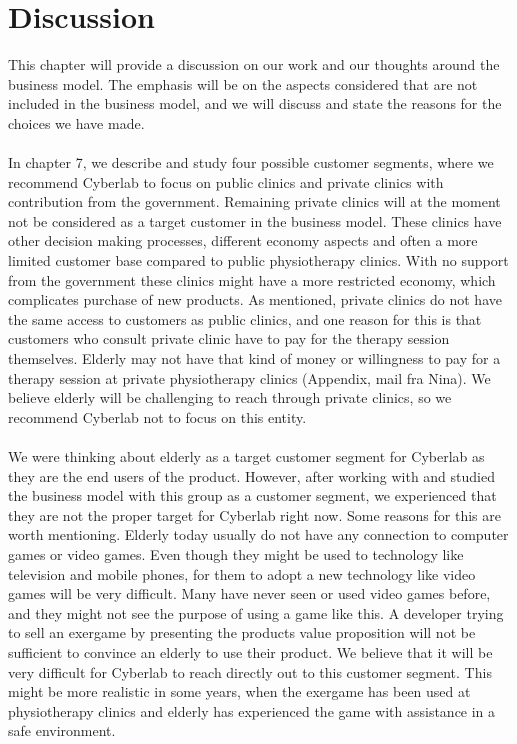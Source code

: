 \chapter{Discussion}
This chapter will provide a discussion on our work and our thoughts around the business model. The emphasis will be on the aspects considered that are not included in the business model, and we will discuss and state the reasons for the choices we have made.  \\ \\
In chapter 7, we describe and study four possible customer segments, where we recommend Cyberlab to focus on public clinics and private clinics with contribution from the government. Remaining private clinics will at the moment not be considered as a target customer in the business model. These clinics have other decision making processes, different economy aspects and often a more limited customer base compared to public physiotherapy clinics. With no support from the government these clinics might have a more restricted economy, which complicates purchase of new products. As mentioned, private clinics do not have the same access to customers as public clinics, and one reason for this is that customers who consult private clinic have to pay for the therapy session themselves. Elderly may not have that kind of money or willingness to pay for a therapy session at private physiotherapy clinics (Appendix, mail fra Nina). We believe elderly will be challenging to reach through private clinics, so we recommend Cyberlab not to focus on this entity. \\ \\
We were thinking about elderly as a target customer segment for Cyberlab as they are the end users of the product. However, after working with and studied the business model with this group as a customer segment, we experienced that they are not the proper target for Cyberlab right now. Some reasons for this are worth mentioning. Elderly today usually do not have any connection to computer games or video games. Even though they might be used to technology like television and mobile phones, for them to adopt a new technology like video games will be very difficult. Many have never seen or used video games before, and they might not see the purpose of using a game like this. A developer trying to sell an exergame by presenting the products value proposition will not be sufficient to convince an elderly to use their product. We believe that it will be very difficult for Cyberlab to reach directly out to this customer segment. This might be more realistic in some years, when the exergame has been used at physiotherapy clinics and elderly has experienced the game with assistance in a safe environment.\\ \\
